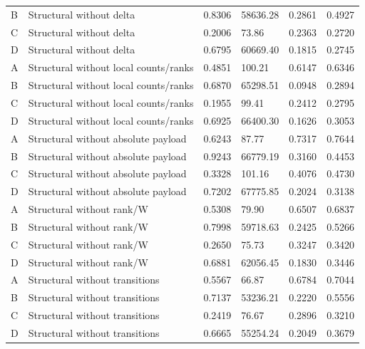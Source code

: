 \documentclass[12pt,a4paper,oneside,openany]{extbook}
\begin{document}
\begin{longtable}{P{1.1cm}P{4.2cm}P{1.6cm}P{2.2cm}P{1.6cm}P{1.6cm}}
B & Structural without delta & 0.8306 & 58636.28 & 0.2861 & 0.4927\\
C & Structural without delta & 0.2006 & 73.86 & 0.2363 & 0.2720\\
D & Structural without delta & 0.6795 & 60669.40 & 0.1815 & 0.2745\\
A & Structural without local counts/ranks & 0.4851 & 100.21 & 0.6147 & 0.6346\\
B & Structural without local counts/ranks & 0.6870 & 65298.51 & 0.0948 & 0.2894\\
C & Structural without local counts/ranks & 0.1955 & 99.41 & 0.2412 & 0.2795\\
D & Structural without local counts/ranks & 0.6925 & 66400.30 & 0.1626 & 0.3053\\
A & Structural without absolute payload & 0.6243 & 87.77 & 0.7317 & 0.7644\\
B & Structural without absolute payload & 0.9243 & 66779.19 & 0.3160 & 0.4453\\
C & Structural without absolute payload & 0.3328 & 101.16 & 0.4076 & 0.4730\\
D & Structural without absolute payload & 0.7202 & 67775.85 & 0.2024 & 0.3138\\
A & Structural without rank/W & 0.5308 & 79.90 & 0.6507 & 0.6837\\
B & Structural without rank/W & 0.7998 & 59718.63 & 0.2425 & 0.5266\\
C & Structural without rank/W & 0.2650 & 75.73 & 0.3247 & 0.3420\\
D & Structural without rank/W & 0.6881 & 62056.45 & 0.1830 & 0.3446\\
A & Structural without transitions & 0.5567 & 66.87 & 0.6784 & 0.7044\\
B & Structural without transitions & 0.7137 & 53236.21 & 0.2220 & 0.5556\\
C & Structural without transitions & 0.2419 & 76.67 & 0.2896 & 0.3210\\
D & Structural without transitions & 0.6665 & 55254.24 & 0.2049 & 0.3679\\
\bottomrule\end{longtable}
\end{document}
